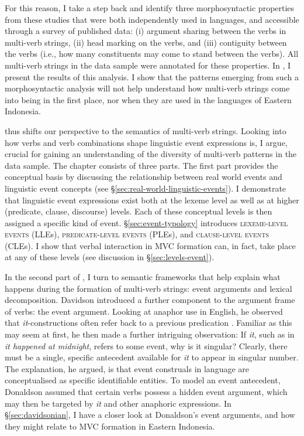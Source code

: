 For this reason, I take a step back and identify three morphosyntactic properties from these studies that were both independently used in languages, and accessible through a survey of published data: (i) argument sharing between the verbs in multi-verb strings, (ii) head marking on the verbs, and (iii) contiguity between the verbs (i.e., how many constituents may come to stand between the verbs). All multi-verb strings in the data sample were annotated for these properties. In , I present the results of this analysis. I show that the patterns emerging from such a morphosyntactic analysis will not help understand how multi-verb strings come into being in the first place, nor when they are used in the languages of Eastern Indonesia.

 thus shifts our perspective to the semantics of multi-verb strings. Looking into how verbs and verb combinations shape linguistic event expressions is, I argue, crucial for gaining an understanding of the diversity of multi-verb patterns in the data sample. The chapter consists of three parts. The first part provides the conceptual basis by discussing the relationship between real world events and linguistic event concepts (see §\ref{sec:real-world-linguistic-events}). I demonstrate that linguistic event expressions exist both at the lexeme level as well as at higher (predicate, clause, discourse) levels. Each of these conceptual levels is then assigned a specific kind of event. §\ref{sec:event-typology} introduces \textsc{lexeme-level events} (LLEs), \textsc{predicate-level events} (PLEs), and \textsc{clause-level events} (CLEs). I show that verbal interaction in MVC formation can, in fact, take place at any of these levels (see discussion in §\ref{sec:levels-event}). 

In the second part of , I turn to semantic frameworks that help explain what happens during the formation of multi-verb strings: event arguments and lexical decomposition. Davidson introduced a further component to the argument frame of verbs: the event argument. Looking at anaphor use in English, he observed that \textit{it}-constructions often refer back to a previous predication \citep{davidson1967logical}. Familiar as this may seem at first, he then made a further intriguing observation: If \textit{it}, such as in \textit{it happened at midnight}, refers to some event, why is it singular? Clearly, there must be a single, specific antecedent available for \textit{it} to appear in singular number. The explanation, he argued, is that event construals in language are conceptualised as specific identifiable entities. To model an event antecedent, Donaldson assumed that certain verbs possess a hidden event argument, which may then be targeted by \textit{it} and other anaphoric expressions. In §\ref{sec:davidsonian}, I have a closer look at Donaldson's event arguments, and how they might relate to MVC formation in Eastern Indonesia. 

